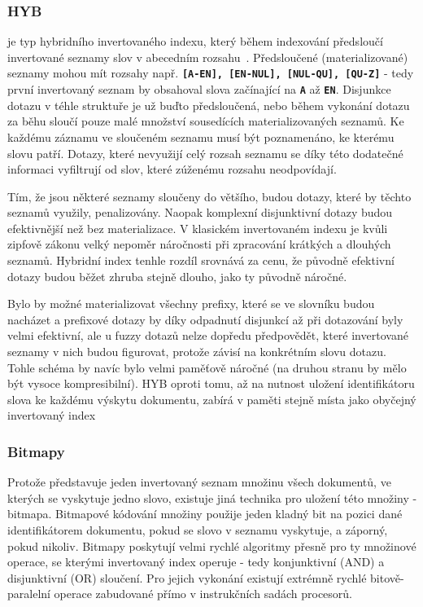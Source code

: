 \documentclass[11pt,letterpaper,oneside,openright]{book}
\newcommand{\bftt}[1]{\texttt{\textbf{#1}}}
\begin{document}
\subsubsection{HYB} \label{sec:hyb} je typ hybridního invertovaného indexu,
který během indexování předsloučí invertované seznamy slov v abecedním
rozsahu~\cite{Bast:2006:TLF:1148170.1148234}. Předsloučené (materializované)
seznamy mohou mít rozsahy např. \bftt{[A-EN], [EN-NUL], [NUL-QU], [QU-Z]} -
tedy první invertovaný seznam by obsahoval slova začínající na \bftt{A} až
\bftt{EN}. Disjunkce dotazu v téhle struktuře je už buďto předsloučená, nebo
během vykonání dotazu za běhu sloučí pouze malé množství sousedících
materializovaných seznamů. Ke každému záznamu ve sloučeném seznamu musí být
poznamenáno, ke kterému slovu patří. Dotazy, které nevyužijí celý rozsah
seznamu se díky této dodatečné informaci vyfiltrují od slov, které zúženému
rozsahu neodpovídají.

Tím, že jsou některé seznamy sloučeny do většího, budou dotazy, které by těchto
seznamů využily, penalizovány. Naopak komplexní disjunktivní dotazy budou
efektivnější než bez materializace. V klasickém invertovaném indexu je kvůli
zipfově zákonu velký nepoměr náročnosti při zpracování krátkých a dlouhých
seznamů. Hybridní index tenhle rozdíl srovnává za cenu, že původně efektivní
dotazy budou běžet zhruba stejně dlouho, jako ty původně náročné.

Bylo by možné materializovat všechny prefixy, které se ve slovníku budou
nacházet a prefixové dotazy by díky odpadnutí disjunkcí až při dotazování byly
velmi efektivní, ale u fuzzy dotazů nelze dopředu předpovědět, které
invertované seznamy v nich budou figurovat, protože závisí na konkrétním slovu
dotazu. Tohle schéma by navíc bylo velmi paměťově náročné (na druhou stranu by
mělo být vysoce kompresibilní). HYB oproti tomu, až na nutnost uložení
identifikátoru slova ke každému výskytu dokumentu, zabírá v paměti stejně místa
jako obyčejný invertovaný index

\subsubsection{Bitmapy}
Protože představuje jeden invertovaný seznam množinu všech dokumentů, ve
kterých se vyskytuje jedno slovo, existuje jiná technika pro uložení této
množiny - bitmapa. Bitmapové kódování množiny použije jeden kladný bit na
pozici dané identifikátorem dokumentu, pokud se slovo v seznamu vyskytuje, a
záporný, pokud nikoliv. Bitmapy poskytují velmi rychlé algoritmy přesně pro ty
množinové operace, se kterými invertovaný index operuje - tedy konjunktivní
(AND) a disjunktivní (OR) sloučení. Pro jejich vykonání existují extrémně
rychlé bitově-paralelní operace zabudované přímo v instrukčních sadách
procesorů.
\end{document}
